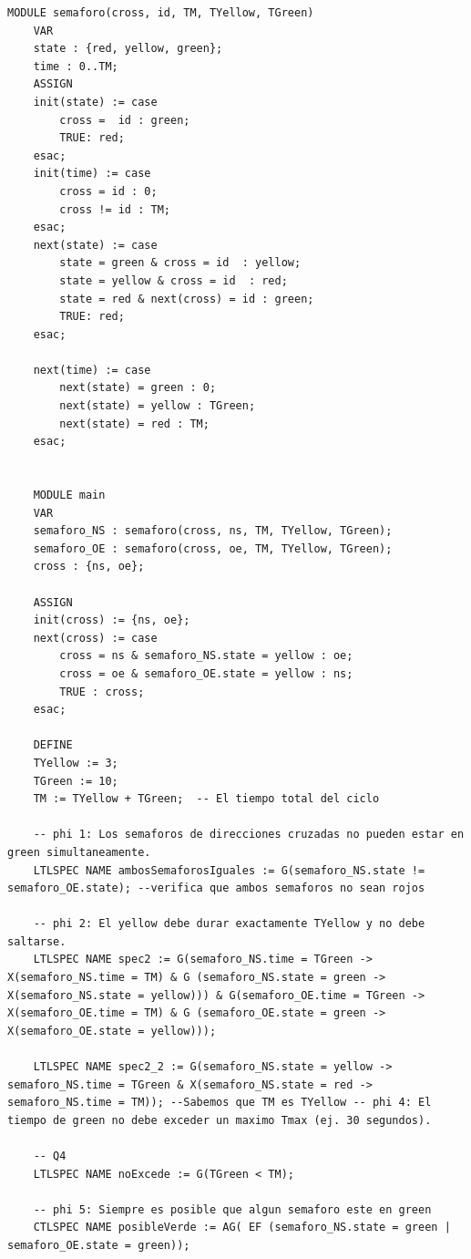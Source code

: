 \begin{lstlisting}[language=NuSMV]
    MODULE semaforo(cross, id, TM, TYellow, TGreen)
    VAR
    state : {red, yellow, green};
    time : 0..TM;
    ASSIGN
    init(state) := case
        cross =  id : green;
        TRUE: red;
    esac;
    init(time) := case
        cross = id : 0;
        cross != id : TM;
    esac;
    next(state) := case
        state = green & cross = id  : yellow;
        state = yellow & cross = id  : red;
        state = red & next(cross) = id : green;
        TRUE: red;
    esac;

    next(time) := case
        next(state) = green : 0;
        next(state) = yellow : TGreen;
        next(state) = red : TM;
    esac;


    MODULE main
    VAR
    semaforo_NS : semaforo(cross, ns, TM, TYellow, TGreen);
    semaforo_OE : semaforo(cross, oe, TM, TYellow, TGreen);
    cross : {ns, oe};

    ASSIGN
    init(cross) := {ns, oe};
    next(cross) := case
        cross = ns & semaforo_NS.state = yellow : oe;
        cross = oe & semaforo_OE.state = yellow : ns;
        TRUE : cross;
    esac;

    DEFINE
    TYellow := 3;
    TGreen := 10;
    TM := TYellow + TGreen;  -- El tiempo total del ciclo

    -- phi 1: Los semaforos de direcciones cruzadas no pueden estar en green simultaneamente.
    LTLSPEC NAME ambosSemaforosIguales := G(semaforo_NS.state != semaforo_OE.state); --verifica que ambos semaforos no sean rojos

    -- phi 2: El yellow debe durar exactamente TYellow y no debe saltarse.
    LTLSPEC NAME spec2 := G(semaforo_NS.time = TGreen -> X(semaforo_NS.time = TM) & G (semaforo_NS.state = green -> X(semaforo_NS.state = yellow))) & G(semaforo_OE.time = TGreen -> X(semaforo_OE.time = TM) & G (semaforo_OE.state = green -> X(semaforo_OE.state = yellow)));

    LTLSPEC NAME spec2_2 := G(semaforo_NS.state = yellow -> semaforo_NS.time = TGreen & X(semaforo_NS.state = red -> semaforo_NS.time = TM)); --Sabemos que TM es TYellow -- phi 4: El tiempo de green no debe exceder un maximo Tmax (ej. 30 segundos).

    -- Q4
    LTLSPEC NAME noExcede := G(TGreen < TM);

    -- phi 5: Siempre es posible que algun semaforo este en green
    CTLSPEC NAME posibleVerde := AG( EF (semaforo_NS.state = green | semaforo_OE.state = green));

\end{lstlisting}


